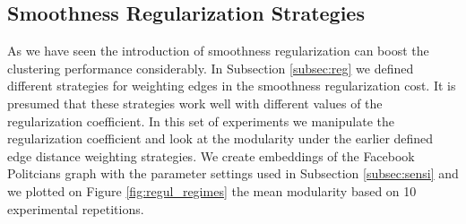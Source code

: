 \subsection{Smoothness Regularization Strategies}
As we have seen the introduction of smoothness regularization can boost the clustering performance considerably. In Subsection \ref{subsec:reg} we defined different strategies for weighting edges in the smoothness regularization cost. It is presumed that these strategies work well with different values of the regularization coefficient. In this set of experiments we manipulate the regularization coefficient and look at the modularity under the earlier defined edge distance weighting strategies. We create embeddings of the Facebook Politcians graph with the parameter settings used in Subsection \ref{subsec:sensi} and we plotted on Figure \ref{fig:regul_regimes} the mean modularity based on 10 experimental repetitions.
